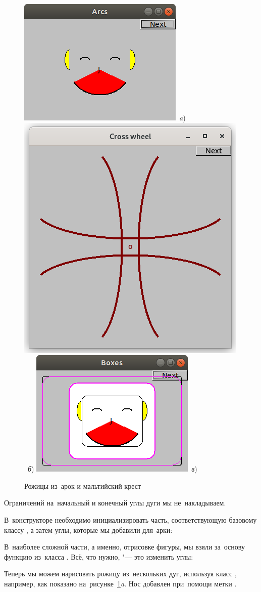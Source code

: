 \begin{figure}[ht]
  {\centering
    \includegraphics[height=0.25\textwidth]{images/arc.png}~\textit{a})
    \hfil
    \includegraphics[height=0.25\textwidth]{images/cross_wheel.png}~\textit{б})
    \hfil
    \includegraphics[height=0.25\textwidth]{images/box.png}~\textit{в})

  }
  \caption{Рожицы из~арок и мальтийский крест}
  \label{fig:arc}
\end{figure}


\noindent
Ограничений на~начальный и конечный углы дуги мы не~накладываем.

В~конструкторе необходимо инициализировать часть, соответствующую базовому классу , а затем углы, которые мы добавили для~арки:

В~наиболее сложной части, а именно, отрисовке фигуры, мы взяли за~основу функцию из~класса . Всё, что нужно, "--- это изменить углы:

Теперь мы можем нарисовать рожицу из~нескольких дуг, используя класс , например, как показано на~рисунке~\ref{fig:arc}\textit{a}. Нос добавлен при~помощи метки .



